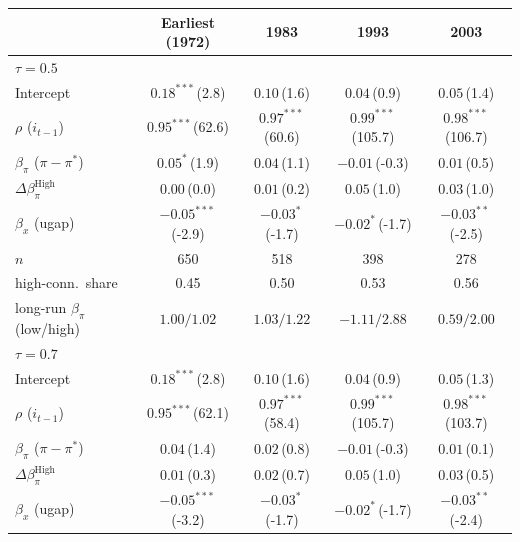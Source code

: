 \setlength{\tabcolsep}{4pt}\scriptsize
\begin{tabular}{lcccc}
\toprule
 & Earliest (1972) & 1983 & 1993 & 2003 \\
\midrule
\multicolumn{5}{l}{\textit{$\tau=0.5$}} \\
Intercept & $0.18^{***}$\,{\scriptsize(2.8)} & $0.10$\,{\scriptsize(1.6)} & $0.04$\,{\scriptsize(0.9)} & $0.05$\,{\scriptsize(1.4)} \\
$\rho$ ($i_{t-1}$) & $0.95^{***}$\,{\scriptsize(62.6)} & $0.97^{***}$\,{\scriptsize(60.6)} & $0.99^{***}$\,{\scriptsize(105.7)} & $0.98^{***}$\,{\scriptsize(106.7)} \\
$\beta_\pi$ ($\pi-\pi^*$) & $0.05^{*}$\,{\scriptsize(1.9)} & $0.04$\,{\scriptsize(1.1)} & $-0.01$\,{\scriptsize(-0.3)} & $0.01$\,{\scriptsize(0.5)} \\
$\Delta\beta_\pi^{\text{High}}$ & $0.00$\,{\scriptsize(0.0)} & $0.01$\,{\scriptsize(0.2)} & $0.05$\,{\scriptsize(1.0)} & $0.03$\,{\scriptsize(1.0)} \\
$\beta_x$ (ugap) & $-0.05^{***}$\,{\scriptsize(-2.9)} & $-0.03^{*}$\,{\scriptsize(-1.7)} & $-0.02^{*}$\,{\scriptsize(-1.7)} & $-0.03^{**}$\,{\scriptsize(-2.5)} \\
\addlinespace
$n$ & 650 & 518 & 398 & 278 \\
high-conn.\ share & 0.45 & 0.50 & 0.53 & 0.56 \\
long-run $\beta_\pi$ (low/high) & $1.00/1.02$ & $1.03/1.22$ & $-1.11/2.88$ & $0.59/2.00$ \\
\midrule
\multicolumn{5}{l}{\textit{$\tau=0.7$}} \\
Intercept & $0.18^{***}$\,{\scriptsize(2.8)} & $0.10$\,{\scriptsize(1.6)} & $0.04$\,{\scriptsize(0.9)} & $0.05$\,{\scriptsize(1.3)} \\
$\rho$ ($i_{t-1}$) & $0.95^{***}$\,{\scriptsize(62.1)} & $0.97^{***}$\,{\scriptsize(58.4)} & $0.99^{***}$\,{\scriptsize(105.7)} & $0.98^{***}$\,{\scriptsize(103.7)} \\
$\beta_\pi$ ($\pi-\pi^*$) & $0.04$\,{\scriptsize(1.4)} & $0.02$\,{\scriptsize(0.8)} & $-0.01$\,{\scriptsize(-0.3)} & $0.01$\,{\scriptsize(0.1)} \\
$\Delta\beta_\pi^{\text{High}}$ & $0.01$\,{\scriptsize(0.3)} & $0.02$\,{\scriptsize(0.7)} & $0.05$\,{\scriptsize(1.0)} & $0.03$\,{\scriptsize(0.5)} \\
$\beta_x$ (ugap) & $-0.05^{***}$\,{\scriptsize(-3.2)} & $-0.03^{*}$\,{\scriptsize(-1.7)} & $-0.02^{*}$\,{\scriptsize(-1.7)} & $-0.03^{**}$\,{\scriptsize(-2.4)} \\

\end{tabular}
